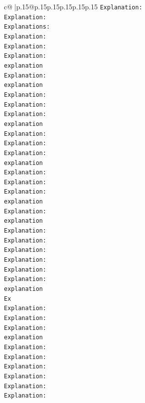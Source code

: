 \documentclass{article}
\begin{document}
{\begin{supertabular}{c@{$\;$}|p{.15\linewidth}@{}p{.15\linewidth}p{.15\linewidth}p{.15\linewidth}p{.15\linewidth}p{.15\linewidth}}
{{{\texttt{Explanation:} \\
\texttt{Explanation:} \\
\texttt{Explanations:} \\
\texttt{Explanation:} \\
\texttt{Explanation:} \\
\texttt{Explanation:} \\
\texttt{explanation} \\
\texttt{Explanation:} \\
\texttt{explanation} \\
\texttt{Explanation:} \\
\texttt{Explanation:} \\
\texttt{Explanation:} \\
\texttt{explanation} \\
\texttt{Explanation:} \\
\texttt{Explanation:} \\
\texttt{Explanation:} \\
\texttt{explanation} \\
\texttt{Explanation:} \\
\texttt{Explanation:} \\
\texttt{Explanation:} \\
\texttt{explanation} \\
\texttt{Explanation:} \\
\texttt{explanation} \\
\texttt{Explanation:} \\
\texttt{Explanation:} \\
\texttt{Explanation:} \\
\texttt{Explanation:} \\
\texttt{Explanation:} \\
\texttt{Explanation:} \\
\texttt{explanation} \\
\texttt{Ex} \\
\texttt{Explanation:} \\
\texttt{Explanation:} \\
\texttt{Explanation:} \\
\texttt{explanation} \\
\texttt{Explanation:} \\
\texttt{Explanation:} \\
\texttt{Explanation:} \\
\texttt{Explanation:} \\
\texttt{Explanation:} \\
\texttt{Explanation:} \\
}}}
\end{supertabular}}
\end{document}
